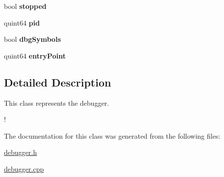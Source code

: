 \begin{DoxyCompactItemize}
\item 
\hypertarget{class_debugger_a97f6c18d3d76887b7cb4dbb15aa8d44d}{}bool {\bfseries stopped}\label{class_debugger_a97f6c18d3d76887b7cb4dbb15aa8d44d}

\item 
\hypertarget{class_debugger_af48358ff43c602ca6cf1766c0ebff92a}{}quint64 {\bfseries pid}\label{class_debugger_af48358ff43c602ca6cf1766c0ebff92a}

\item 
\hypertarget{class_debugger_a407fb1b514f65eae94dede657442a327}{}bool {\bfseries dbg\+Symbols}\label{class_debugger_a407fb1b514f65eae94dede657442a327}

\item 
\hypertarget{class_debugger_a8f11bcbf15b0d90b62f0d44bdfe2e404}{}quint64 {\bfseries entry\+Point}\label{class_debugger_a8f11bcbf15b0d90b62f0d44bdfe2e404}

\end{DoxyCompactItemize}


\subsection{Detailed Description}
This class represents the debugger. 

! 

The documentation for this class was generated from the following files\+:\begin{DoxyCompactItemize}
\item 
\hyperlink{debugger_8h}{debugger.\+h}\item 
\hyperlink{debugger_8cpp}{debugger.\+cpp}\end{DoxyCompactItemize}
